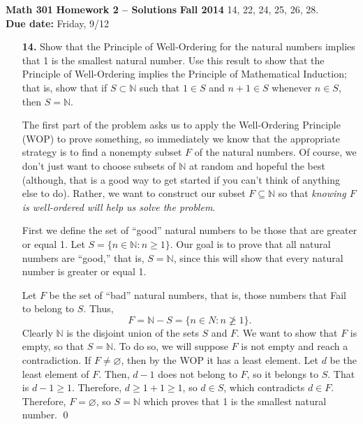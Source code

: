 \documentclass[12pt,reqno]{amsart}
\newcommand{\N}{\ensuremath{\mathbb{N}}}
\renewcommand{\emptyset}{\ensuremath{\varnothing}}
\begin{document}
\noindent \textbf{Math 301} \hskip3cm {\bf Homework 2 -- Solutions} \hfill {\bf Fall 2014}
\vskip1cm
  14, 22, 24, 25, 26, 28.  \\
{\bf Due date:} Friday, 9/12

\medskip

\begin{enumerate}

\item[{\bf 14.}]
Show that the Principle of Well-Ordering for the natural numbers implies that 1 is the smallest natural number.  Use this result to show that the Principle of Well-Ordering implies the Principle of Mathematical Induction; that is, show that if $S \subset {\mathbb N}$ such that $1 \in S$ and $n + 1 \in S$ whenever $n \in S$, then $S = {\mathbb N}$.  

\medskip

The first part of the problem asks us to apply the Well-Ordering Principle (WOP) to
prove something, so immediately we know that the appropriate strategy is to find 
a nonempty subset $F$ of the natural numbers.  Of course, we don't just want to
choose subsets of $\N$ at random and hopeful the best (although, that is
a good way to get started if you can't think of anything else to do). Rather, we
want to construct our subset $F \subseteq \N$ so that \emph{knowing $F$ is
  well-ordered will help us solve the problem}.  

First we define the set of ``good'' natural numbers to be those that are greater
or equal 1.  Let $S = \{n \in \N : n \geq 1\}$.  Our goal is to prove that all
natural numbers are ``good,'' that is, $S = \N$, since this will show that every
natural number is greater or equal 1. 

Let $F$ be the set of ``bad'' natural numbers, that is, those numbers that Fail
to belong to $S$.  Thus,
\[
F = \N - S = \{n \in N : n \ngeq 1\}.
\]
Clearly $\N$ is the
disjoint union of the sets $S$ and $F$.  We want to show that
$F$ is empty, so that $S = \N$. To do so, we will suppose $F$ is not empty and
reach a contradiction. If $F \neq \emptyset$, then by the WOP it has a least element. 
Let $d$ be the least element of $F$.  Then, $d-1$ does not belong to $F$, so it
belongs to $S$.  That is $d-1 \geq 1$.  Therefore, $d \geq 1+1 \geq 1$, so 
$d\in S$, which contradicts $d\in F$.
Therefore, $F = \emptyset$, so $S = \N$ which proves that 1 is the smallest
natural number.
\qed


\end{enumerate}
\end{document}
